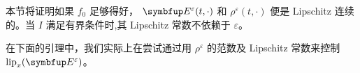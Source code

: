 本节将证明如果 $f_{0}$ 足够得好， $\vE^{\varepsilon}(t, \cdot)$ 和 $\rho^{\varepsilon}(t, \cdot)$ 便是 Lipschitz 连续的。当 $I$ 满足有界条件时,其 Lipschitz 常数不依赖于 $\varepsilon$。

在下面的引理中，我们实际上在尝试通过用 $\rho^\varepsilon$ 的范数及 Lipschitz 常数来控制 $\operatorname{lip}_x (\vE^\varepsilon)$。%

